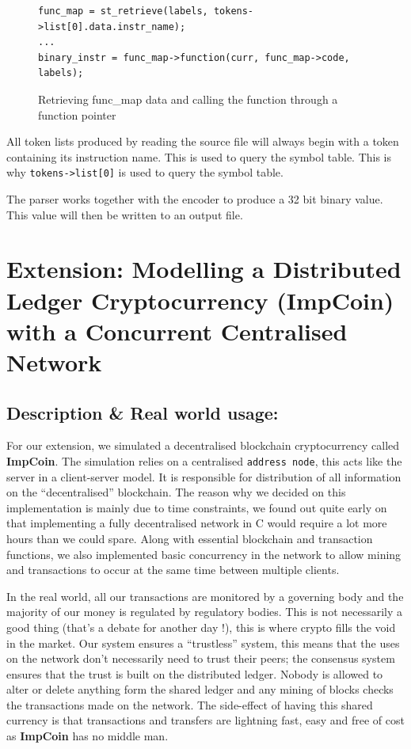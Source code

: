 \documentclass[a4paper]{article}
\begin{document}
\begin{figure}[htp]
\centering
\begin{BVerbatim}
func_map = st_retrieve(labels, tokens->list[0].data.instr_name);
...
binary_instr = func_map->function(curr, func_map->code, labels);
\end{BVerbatim}
\caption{Retrieving func\_map data and calling the function through a function pointer}
\label{fig:calling functions with func map}
\end{figure}

All token lists produced by reading the source file will always begin with a token containing its instruction name. This is used to query the symbol table. This is why \verb|tokens->list[0]| is used to query the symbol table.

The parser works together with the encoder to produce a 32 bit binary value. This value will then be written to an output file.

\section{Extension: Modelling a Distributed Ledger Cryptocurrency (ImpCoin) with a Concurrent Centralised Network}
\subsection{Description \& Real world usage:}

For our extension, we simulated a decentralised blockchain cryptocurrency called \textbf{ImpCoin}. The simulation relies on a centralised \verb|address node|, this acts like the server in a client-server model. It is responsible for distribution of all information on the ``decentralised'' blockchain. The reason why we decided on this implementation is mainly due to time constraints, we found out quite early on that implementing a fully decentralised network in C would require a lot more hours than we could spare. Along with essential blockchain and transaction functions, we also implemented basic concurrency in the network to allow mining and transactions to occur at the same time between multiple clients.

In the real world, all our transactions are monitored by a governing body and the majority of our money is regulated by regulatory bodies. This is not necessarily a good thing (that's a debate for another day !), this is where crypto fills the void in the market. Our system ensures a ``trustless'' system, this means that the uses on the network don't necessarily need to trust their peers; the consensus system ensures that the trust is built on the distributed ledger. Nobody is allowed to alter or delete anything form the shared ledger and any mining of blocks checks the transactions made on the network. The side-effect of having this shared currency is that transactions and transfers are lightning fast, easy and free of cost as \textbf{ImpCoin} has no middle man.
\end{document}
